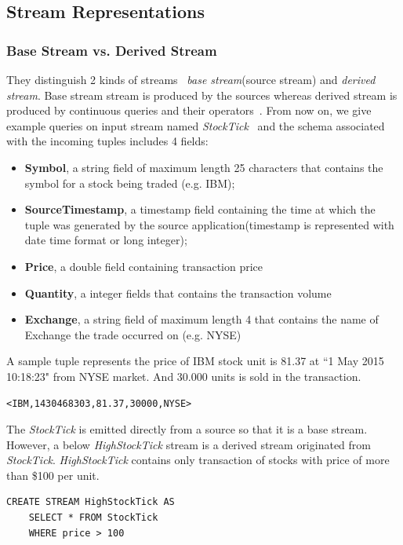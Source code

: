 \subsection*{Stream Representations}
\subsubsection*{Base Stream vs. Derived Stream}
They distinguish 2 kinds of streams~\citep{Kramer:2009} \textit{base stream}(source stream) and \textit{derived stream}. Base stream stream is produced by the sources whereas derived stream is produced by continuous queries and their operators~\citep{Arasu:2006}. 
From now on, we give example queries on input stream named \textit{StockTick}~\citep{StreamBaseTut} and the schema associated with the incoming tuples includes 4 fields:
\begin{itemize}
\item \textbf{Symbol}, a string field of maximum length 25 characters that contains the symbol for a stock being traded (e.g. IBM);
\item \textbf{SourceTimestamp}, a timestamp field containing the time at which the tuple was generated by the source application(timestamp is represented with date time format or long integer);
\item \textbf{Price}, a double field containing transaction price
\item \textbf{Quantity}, a integer fields that contains the transaction volume
\item \textbf{Exchange}, a string field of maximum length 4 that contains the name of Exchange the trade occurred on (e.g. NYSE)

\end{itemize}
A sample tuple represents the price of IBM stock unit is 81.37 at ``1 May 2015 10:18:23" from NYSE market. And 30.000 units is sold in the transaction. 
\begin{verbatim}
<IBM,1430468303,81.37,30000,NYSE>
\end{verbatim}

The \textit{StockTick} is emitted directly from a source so that it is a base stream. However, a below \textit{HighStockTick} stream is a derived stream originated from \textit{StockTick}. \textit{HighStockTick} contains only transaction of stocks with price of more than \$100 per unit.

\begin{verbatim}
CREATE STREAM HighStockTick AS
	SELECT * FROM StockTick 
	WHERE price > 100
\end{verbatim}

